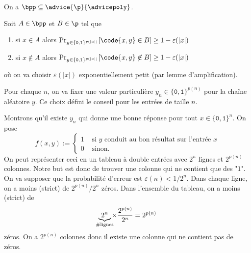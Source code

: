 \documentclass[./main]{subfiles}
\begin{document}
  \begin{thm}
    On a $\bpp \subseteq \advice{\p}{\advicepoly}$.
  \end{thm}
  \begin{prv}
    Soit $A \in \bpp$ et $B \in \p$ tel que
    \begin{enumerate}
      \item si $x \in A$ alors $\Pr_{y \in \{\texttt{0},\texttt{1}\}^{p(|x|)}}[\code{x,y} \in B] \ge 1 - \varepsilon(|x|)$
      \item si $x \not\in A$ alors $\Pr_{y \in \{\texttt{0},\texttt{1}\}^{p(|x|)}}[\code{x,y} \not\in B] \ge 1 - \varepsilon(|x|)$
    \end{enumerate}
    où on va choisir $\varepsilon(|x|)$ exponentiellement petit (par lemme d'amplification).

    Pour chaque $n$, on va fixer une valeur particulière $y_n \in \{\texttt{0},\texttt{1}\}^{p(n)}$ pour la chaîne aléatoire $y$.
    Ce choix défini le conseil pour les entrées de taille $n$.

    Montrons qu'il existe $y_n$ qui donne une bonne réponse pour tout $x \in \{\texttt{0},\texttt{1}\}^n$.
    On pose
    \[
    f(x,y) := 
    \begin{cases}
      1 & \text{ si $y$ conduit au bon résultat sur l'entrée $x$}\\
      0 & \text{ sinon}.
    \end{cases}
    \]
    On peut représenter ceci en un tableau à double entrées avec $2^n$ lignes et $2^{p(n)}$ colonnes.
    Notre but est donc de trouver une colonne qui ne contient que des "$1$".
    On va supposer que la probabilité d'erreur est $\varepsilon(n) < 1 / 2^n$.
    Dans chaque ligne, on a moins (strict) de $2^{p(n)} / 2^n$ zéros.
    Dans l'ensemble du tableau, on a moins (strict) de
    \[
      \underbrace{2^n}_{\mathclap{\#\text{lignes}}} \times \frac{2^{p(n)}}{2^n} = 2^{p(n)}
    \] zéros.
    On a $2^{p(n)}$ colonnes donc il existe une colonne qui ne contient pas de zéros.
  \end{prv}
\end{document}
